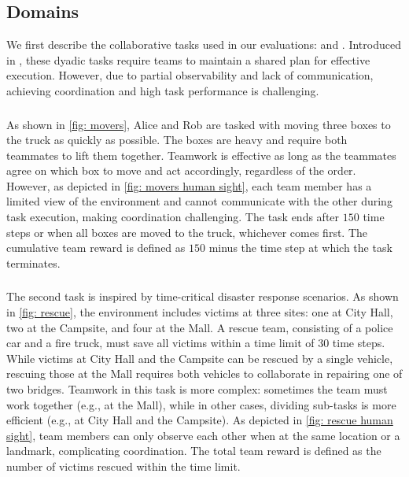 \subsection{Domains}
\label{sec. domains}
We first describe the collaborative tasks used in our evaluations: \movers and \rescue. Introduced in \cite{seo2023automated}, these dyadic tasks require teams to maintain a shared plan for effective execution. However, due to partial observability and lack of communication, achieving coordination and high task performance is challenging.

\subsubsection{\movers}
As shown in \cref{fig: movers}, Alice and Rob are tasked with moving three boxes to the truck as quickly as possible. The boxes are heavy and require both teammates to lift them together. Teamwork is effective as long as the teammates agree on which box to move and act accordingly, regardless of the order. However, as depicted in \cref{fig: movers human sight}, each team member has a limited view of the environment and cannot communicate with the other during task execution, making coordination challenging. The task ends after $150$ time steps or when all boxes are moved to the truck, whichever comes first. The cumulative team reward is defined as $150$ minus the time step at which the task terminates. 

\subsubsection{\rescue}
The second task is inspired by time-critical disaster response scenarios. As shown in \cref{fig: rescue}, the environment includes victims at three sites: one at City Hall, two at the Campsite, and four at the Mall. A rescue team, consisting of a police car and a fire truck, must save all victims within a time limit of $30$ time steps. While victims at City Hall and the Campsite can be rescued by a single vehicle, rescuing those at the Mall requires both vehicles to collaborate in repairing one of two bridges. Teamwork in this task is more complex: sometimes the team must work together (e.g., at the Mall), while in other cases, dividing sub-tasks is more efficient (e.g., at City Hall and the Campsite). As depicted in \cref{fig: rescue human sight}, team members can only observe each other when at the same location or a landmark, complicating coordination. The total team reward is defined as the number of victims rescued within the time limit. 
